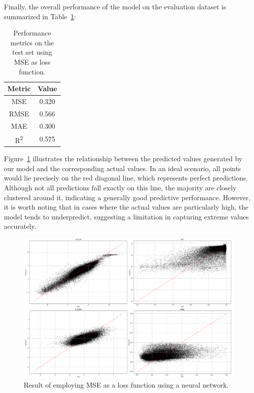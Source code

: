 Finally, the overall performance of the model on the evaluation dataset is summarized in Table~\ref{tab:test_metrics_mse}:

\begin{table}[H]
    \centering
    \begin{tabular}{|c|c|}
    \hline
    \textbf{Metric} & \textbf{Value} \\
    \hline
    MSE & 0.320 \\
    RMSE & 0.566 \\
    MAE & 0.300 \\
    R\textsuperscript{2} & 0.575 \\
    \hline
    \end{tabular}
    \caption{Performance metrics on the test set using MSE as loss function.}
    \label{tab:test_metrics_mse}
\end{table}

Figure~\ref{fig:mse_reg_net_result} illustrates the relationship between the predicted values generated by our model and the corresponding actual values. In an ideal scenario, all points would lie precisely on the red diagonal line, which represents perfect predictions. Although not all predictions fall exactly on this line, the majority are closely clustered around it, indicating a generally good predictive performance. However, it is worth noting that in cases where the actual values are particularly high, the model tends to underpredict, suggesting a limitation in capturing extreme values accurately.

\begin{figure}[H]
    \centering
    \includegraphics[width=1\textwidth]{figures/neural_net_regression_research/output_neural_net_mse.png}
    \caption{Result of employing MSE as a loss function using a neural network.}
    \label{fig:mse_reg_net_result}
\end{figure}

